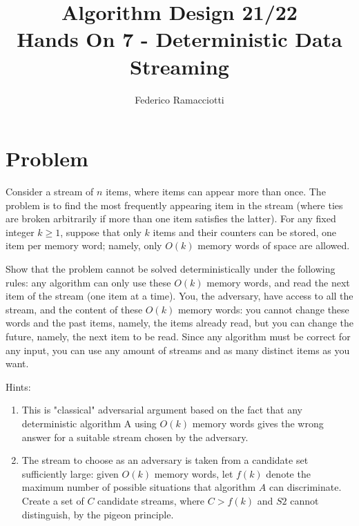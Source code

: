 \documentclass{article}
\title{\LARGE{\textbf{Algorithm Design 21/22}}\\ \vspace{1cm} Hands On 7 - Deterministic Data Streaming}
\author{Federico Ramacciotti}
\date{}
\begin{document}
\maketitle

\section{Problem}
Consider a stream of $n$ items, where items can appear more than once. The problem is to find the most frequently appearing item in the stream (where ties are broken arbitrarily if more than one item satisfies the latter). For any fixed integer $k \geq 1$, suppose that only $k$ items and their counters can be stored, one item per memory word; namely, only $O(k)$ memory words of space are allowed. 

Show that the problem cannot be solved deterministically under the following rules: any algorithm can only use these $O(k)$ memory words, and read the next item of the stream (one item at a time). You, the adversary, have access to all the stream, and the content of these $O(k)$ memory words: you cannot change these words and the past items, namely, the items already read, but you can change the future, namely, the next item to be read. Since any algorithm must be correct for any input, you can use any amount of streams and as many distinct items as you want.

Hints:
\begin{enumerate}
    \item This is "classical" adversarial argument based on the fact that any deterministic algorithm A using $O(k)$ memory words gives the wrong answer for a suitable stream chosen by the adversary. 
    \item The stream to choose as an adversary is taken from a candidate set sufficiently large: given $O(k)$ memory words, let $f(k)$ denote the maximum number of possible situations that algorithm $A$ can discriminate. Create a set of $C$ candidate streams, where $C > f(k)$ and $S2$ cannot distinguish, by the pigeon principle.
\end{enumerate}
\end{document}
